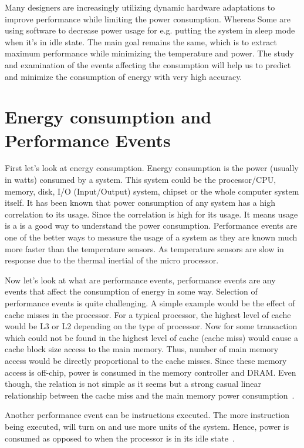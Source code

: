 Many designers are increasingly utilizing dynamic hardware adaptations to improve performance while limiting the power consumption. Whereas Some are using software to decrease power usage for e.g. putting the system in sleep mode when it's in idle state. The main goal remains the same, which is to extract maximum performance while minimizing the temperature and power. The study and examination of the events affecting the consumption will help us to predict and minimize the consumption of energy with very high accuracy.

\section{Energy consumption and Performance Events}

First let's look at energy consumption. Energy consumption is the power (usually in watts) consumed by a system. This system could be the processor/CPU, memory, disk, I/O (Input/Output) system, chipset or the whole computer system itself. It has been known that power consumption of any system has a high correlation to its usage. Since the correlation is high for its usage. It means usage is a is a good way to understand the power consumption. Performance events are one of the better ways to measure the usage of a system as they are known much more faster than the temperature sensors. As temperature sensors are slow in response due to the thermal inertial of the micro processor.

Now let's look at what are performance events, performance events are any events that affect the consumption of energy in some way. Selection of performance events is quite challenging. A simple example would be the effect of cache misses in the processor. For a typical processor, the highest level of cache would be L3 or L2 depending on the type of processor. Now for some transaction which could not be found in the highest level of cache (cache miss) would cause a cache block size access to the main memory. Thus, number of main memory access would be directly proportional to the cache misses. Since these memory access is off-chip, power is consumed in the memory controller and DRAM. Even though, the relation is not simple as it seems but a strong casual linear relationship between the cache miss and the main memory power consumption~\cite{bircher2007complete}.

Another performance event can be instructions executed. The more instruction being executed, will turn on and use more units of the system. Hence, power is consumed as opposed to when the processor is in its idle state~\cite{gilberto2005power}.

